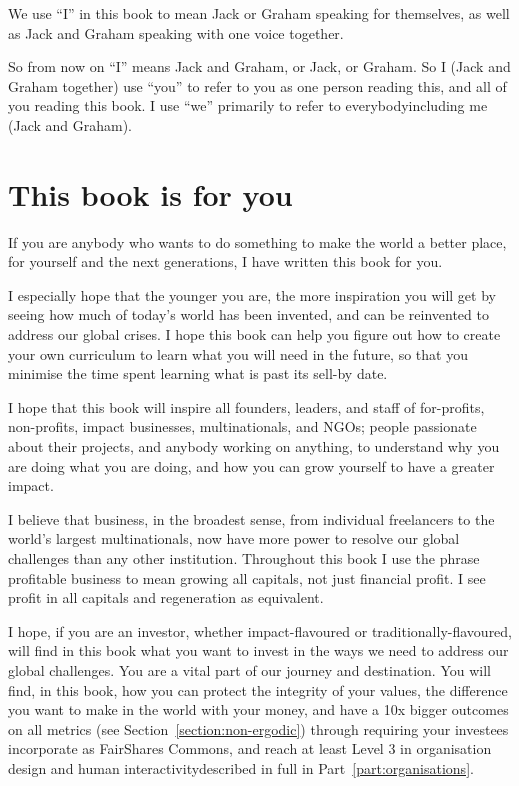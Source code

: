 We use “I” in this book to mean Jack or Graham speaking for themselves, as well as Jack and Graham speaking with one voice together. 


So from now on “I” means Jack and Graham, or Jack, or Graham. So I (Jack and Graham together) use “you” to refer to you as one person reading this, and all of you reading this book. I use “we” primarily to refer to everybody\textemdash including me (Jack and Graham).




\section*{This book is for you}
If you are anybody who wants to do something to make the world a better place, for yourself and the next generations, I have written this book for you. 


I especially hope that the younger you are, the more inspiration you will get by seeing how much of today’s world has been invented, and can be reinvented to address our global crises. I hope this book can help you figure out how to create your own curriculum to learn what you will need in the future, so that you minimise the time spent learning what is past its sell-by date.


I hope that this book will inspire all founders, leaders, and staff of for-profits, non-profits, impact businesses, multinationals, and NGOs; people passionate about their projects, and anybody working on anything, to understand why you are doing what you are doing, and how you can grow yourself to have a greater impact.


I believe that business, in the broadest sense, from individual freelancers to the world's largest multinationals, now have more power to resolve our global challenges than any other institution. Throughout this book I use the phrase profitable business to mean growing all capitals, not just financial profit. I see profit in all capitals and regeneration as equivalent.


I hope, if you are an investor, whether impact\hyp{}flavoured or traditionally\hyp{}flavoured, will find in this book what you want to invest in the ways we need to address our global challenges. You are a vital part of our journey and destination. You will find, in this book, how you can protect the integrity of your values, the difference you want to make in the world with your money, and have a 10x bigger outcomes on all metrics (see Section~\ref{section:non-ergodic}) through requiring your investees incorporate as FairShares Commons, and reach at least Level 3 in organisation design and human interactivity\textemdash described in full in Part~\ref{part:organisations}.


